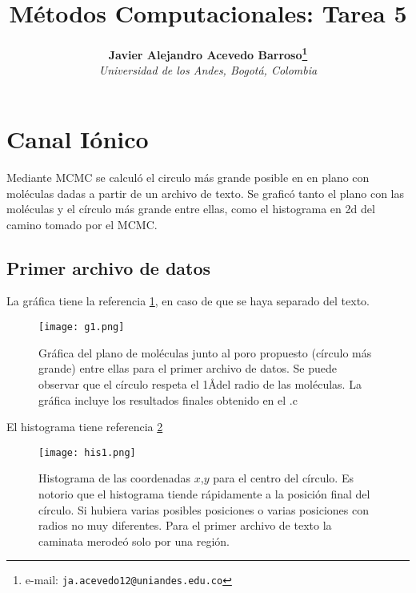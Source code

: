 ﻿\documentclass[notitlepage,letterpaper,12pt]{article} %
\begin{document}
\title{Métodos Computacionales: Tarea 5}
\author{
\textbf{Javier Alejandro Acevedo Barroso\thanks{e-mail: \texttt{ja.acevedo12@uniandes.edu.co}}}\\
\textit{Universidad de los Andes, Bogotá, Colombia}\\
} %

\maketitle %


\newpage
\section{Canal Iónico}

Mediante MCMC se calculó el circulo más grande posible en en plano con moléculas dadas a partir de un archivo de texto. Se graficó tanto el plano con las moléculas y el círculo más grande entre ellas, como el histograma en 2d del camino tomado por el MCMC.

\subsection{Primer archivo de datos}
La gráfica tiene la referencia \ref{g1d1}, en caso de que se haya separado del texto.

\begin{figure}[h]
  \centering
   \texttt{[image: g1.png]}
  \caption{Gráfica del plano de moléculas junto al poro propuesto (círculo más grande) entre ellas para el primer archivo de datos. Se puede observar que el círculo respeta el 1\AA  del radio de las moléculas. La gráfica incluye los resultados finales obtenido en el .c}
  \label{g1d1}
\end{figure}
\newpage

El histograma tiene referencia \ref{g2d1}
\begin{figure}[h]
  \centering
   \texttt{[image: his1.png]}
  \caption{Histograma de las coordenadas $x$,$y$ para el centro del círculo. Es notorio que el histograma tiende rápidamente a la posición final del círculo. Si hubiera varias posibles posiciones o varias posiciones con radios no muy diferentes. Para el primer archivo de texto la caminata merodeó solo por una región. }
  \label{g2d1}
\end{figure}
\end{document}
